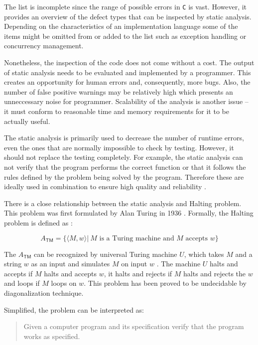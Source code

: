 \documentclass[12pt,final,oneside]{fithesis2}
\begin{document}
The list is incomplete since the range of possible errors in \texttt{C} is
vast. However, it provides an overview of the defect types that can be
inspected by static analysis. Depending on the characteristics of an
implementation language some of the items might be omitted from or added
to the list such as exception handling or concurrency management.

Nonetheless, the inspection of the code does not come without a cost.
The output of static analysis needs to be evaluated and implemented by a
programmer. This creates an opportunity for human errors and, consequently,
more bugs. Also, the number of false positive warnings may be relatively
high which presents an unneccessary noise for programmer. Scalability
of the analysis is another issue -- it must conform to reasonable time
and memory requirements for it to be actually useful.

The static analysis is primarily used to decrease the number of runtime
errors, even the ones that are normally impossible to check by testing.
However, it should not replace the testing completely. For example,
the static analysis can not verify that the program performs the correct
function or that it follows the rules defined by the problem
being solved by the program. Therefore these are ideally used in
combination to ensure high quality and reliability \cite{Ernst03-1}.

There is a close relationship between the static analysis and Halting
problem. This problem was first formulated by Alan Turing in 1936
\cite{Turing36-1}. Formally, the Halting problem is defined as
\cite{Sipser06-1}:

\begin{equation*}
A_{\mathsf{TM}} = \{ \langle M, w \rangle |
  \: M \text{ is a Turing machine and } M \text{ accepts } w \}
\end{equation*}

The $A_{\mathsf{TM}}$ can be recognized by universal Turing machine
$U$, which takes $M$ and a string $w$ as an input and simulates $M$ on input
$w$ \cite{Kozen97-1}. The machine $U$ halts and accepts if $M$ halts and
accepts $w$, it halts and rejects if $M$ halts and rejects the $w$ and loops
if $M$ loops on $w$. This problem has been proved to be undecidable by
diagonalization technique.

Simplified, the problem can be interpreted as:

\begin{quote}

Given a computer program and its specification verify that the program
works as specified.

\end{quote}
\end{document}
